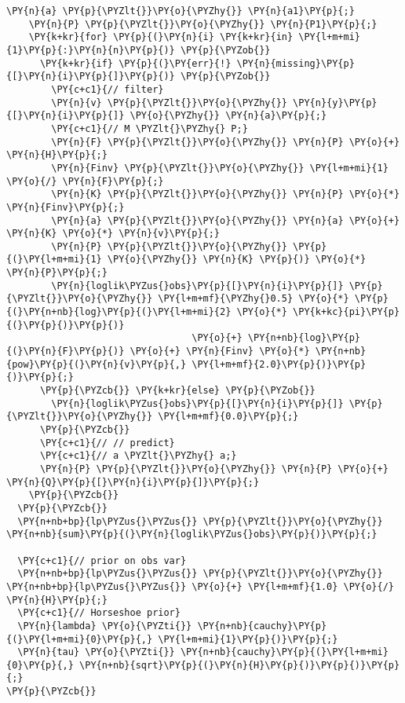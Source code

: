 \begin{Verbatim}[commandchars=\\\{\}]
    \PY{n}{a} \PY{p}{\PYZlt{}}\PY{o}{\PYZhy{}} \PY{n}{a1}\PY{p}{;}
    \PY{n}{P} \PY{p}{\PYZlt{}}\PY{o}{\PYZhy{}} \PY{n}{P1}\PY{p}{;}
    \PY{k+kr}{for} \PY{p}{(}\PY{n}{i} \PY{k+kr}{in} \PY{l+m+mi}{1}\PY{p}{:}\PY{n}{n}\PY{p}{)} \PY{p}{\PYZob{}}
      \PY{k+kr}{if} \PY{p}{(}\PY{err}{!} \PY{n}{missing}\PY{p}{[}\PY{n}{i}\PY{p}{]}\PY{p}{)} \PY{p}{\PYZob{}}
        \PY{c+c1}{// filter}
        \PY{n}{v} \PY{p}{\PYZlt{}}\PY{o}{\PYZhy{}} \PY{n}{y}\PY{p}{[}\PY{n}{i}\PY{p}{]} \PY{o}{\PYZhy{}} \PY{n}{a}\PY{p}{;}
        \PY{c+c1}{// M \PYZlt{}\PYZhy{} P;}
        \PY{n}{F} \PY{p}{\PYZlt{}}\PY{o}{\PYZhy{}} \PY{n}{P} \PY{o}{+} \PY{n}{H}\PY{p}{;}
        \PY{n}{Finv} \PY{p}{\PYZlt{}}\PY{o}{\PYZhy{}} \PY{l+m+mi}{1} \PY{o}{/} \PY{n}{F}\PY{p}{;}
        \PY{n}{K} \PY{p}{\PYZlt{}}\PY{o}{\PYZhy{}} \PY{n}{P} \PY{o}{*} \PY{n}{Finv}\PY{p}{;}
        \PY{n}{a} \PY{p}{\PYZlt{}}\PY{o}{\PYZhy{}} \PY{n}{a} \PY{o}{+} \PY{n}{K} \PY{o}{*} \PY{n}{v}\PY{p}{;}
        \PY{n}{P} \PY{p}{\PYZlt{}}\PY{o}{\PYZhy{}} \PY{p}{(}\PY{l+m+mi}{1} \PY{o}{\PYZhy{}} \PY{n}{K} \PY{p}{)} \PY{o}{*} \PY{n}{P}\PY{p}{;}
        \PY{n}{loglik\PYZus{}obs}\PY{p}{[}\PY{n}{i}\PY{p}{]} \PY{p}{\PYZlt{}}\PY{o}{\PYZhy{}} \PY{l+m+mf}{\PYZhy{}0.5} \PY{o}{*} \PY{p}{(}\PY{n+nb}{log}\PY{p}{(}\PY{l+m+mi}{2} \PY{o}{*} \PY{k+kc}{pi}\PY{p}{(}\PY{p}{)}\PY{p}{)} 
                                 \PY{o}{+} \PY{n+nb}{log}\PY{p}{(}\PY{n}{F}\PY{p}{)} \PY{o}{+} \PY{n}{Finv} \PY{o}{*} \PY{n+nb}{pow}\PY{p}{(}\PY{n}{v}\PY{p}{,} \PY{l+m+mf}{2.0}\PY{p}{)}\PY{p}{)}\PY{p}{;}
      \PY{p}{\PYZcb{}} \PY{k+kr}{else} \PY{p}{\PYZob{}}
        \PY{n}{loglik\PYZus{}obs}\PY{p}{[}\PY{n}{i}\PY{p}{]} \PY{p}{\PYZlt{}}\PY{o}{\PYZhy{}} \PY{l+m+mf}{0.0}\PY{p}{;}
      \PY{p}{\PYZcb{}}
      \PY{c+c1}{// // predict}
      \PY{c+c1}{// a \PYZlt{}\PYZhy{} a;}
      \PY{n}{P} \PY{p}{\PYZlt{}}\PY{o}{\PYZhy{}} \PY{n}{P} \PY{o}{+} \PY{n}{Q}\PY{p}{[}\PY{n}{i}\PY{p}{]}\PY{p}{;}
    \PY{p}{\PYZcb{}}
  \PY{p}{\PYZcb{}}
  \PY{n+nb+bp}{lp\PYZus{}\PYZus{}} \PY{p}{\PYZlt{}}\PY{o}{\PYZhy{}} \PY{n+nb}{sum}\PY{p}{(}\PY{n}{loglik\PYZus{}obs}\PY{p}{)}\PY{p}{;}

  \PY{c+c1}{// prior on obs var}
  \PY{n+nb+bp}{lp\PYZus{}\PYZus{}} \PY{p}{\PYZlt{}}\PY{o}{\PYZhy{}} \PY{n+nb+bp}{lp\PYZus{}\PYZus{}} \PY{o}{+} \PY{l+m+mf}{1.0} \PY{o}{/} \PY{n}{H}\PY{p}{;}
  \PY{c+c1}{// Horseshoe prior}
  \PY{n}{lambda} \PY{o}{\PYZti{}} \PY{n+nb}{cauchy}\PY{p}{(}\PY{l+m+mi}{0}\PY{p}{,} \PY{l+m+mi}{1}\PY{p}{)}\PY{p}{;}
  \PY{n}{tau} \PY{o}{\PYZti{}} \PY{n+nb}{cauchy}\PY{p}{(}\PY{l+m+mi}{0}\PY{p}{,} \PY{n+nb}{sqrt}\PY{p}{(}\PY{n}{H}\PY{p}{)}\PY{p}{)}\PY{p}{;}
\PY{p}{\PYZcb{}}
\end{Verbatim}
